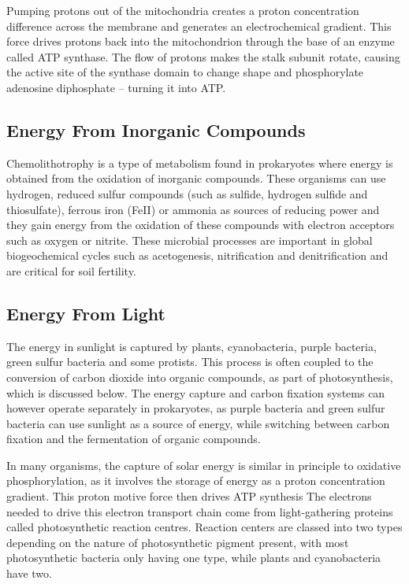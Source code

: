 Pumping protons out of the mitochondria creates a proton concentration difference across the membrane and generates an electrochemical gradient. This force drives protons back into the mitochondrion through the base of an enzyme called ATP synthase. The flow of protons makes the stalk subunit rotate, causing the active site of the synthase domain to change shape and phosphorylate adenosine diphosphate -- turning it into ATP.

\hypertarget{energy-from-inorganic-compounds}{%
\subsection{Energy From Inorganic Compounds}\label{energy-from-inorganic-compounds}}

Chemolithotrophy is a type of metabolism found in prokaryotes where energy is obtained from the oxidation of inorganic compounds. These organisms can use hydrogen, reduced sulfur compounds (such as sulfide, hydrogen sulfide and thiosulfate), ferrous iron (FeII) or ammonia as sources of reducing power and they gain energy from the oxidation of these compounds with electron acceptors such as oxygen or nitrite. These microbial processes are important in global biogeochemical cycles such as acetogenesis, nitrification and denitrification and are critical for soil fertility.

\hypertarget{energy-from-light}{%
\subsection{Energy From Light}\label{energy-from-light}}

The energy in sunlight is captured by plants, cyanobacteria, purple bacteria, green sulfur bacteria and some protists. This process is often coupled to the conversion of carbon dioxide into organic compounds, as part of photosynthesis, which is discussed below. The energy capture and carbon fixation systems can however operate separately in prokaryotes, as purple bacteria and green sulfur bacteria can use sunlight as a source of energy, while switching between carbon fixation and the fermentation of organic compounds.

In many organisms, the capture of solar energy is similar in principle to oxidative phosphorylation, as it involves the storage of energy as a proton concentration gradient. This proton motive force then drives ATP synthesis The electrons needed to drive this electron transport chain come from light-gathering proteins called photosynthetic reaction centres. Reaction centers are classed into two types depending on the nature of photosynthetic pigment present, with most photosynthetic bacteria only having one type, while plants and cyanobacteria have two.

